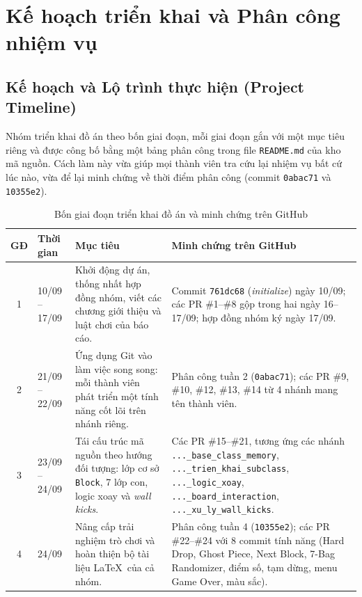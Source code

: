 \section{Kế hoạch triển khai và Phân công nhiệm vụ}

\subsection{Kế hoạch và Lộ trình thực hiện (Project Timeline)}

Nhóm triển khai đồ án theo bốn giai đoạn, mỗi giai đoạn gắn với một mục tiêu riêng và được công bố bằng một bảng phân công trong file \texttt{README.md} của kho mã nguồn. Cách làm này vừa giúp mọi thành viên tra cứu lại nhiệm vụ bất cứ lúc nào, vừa để lại minh chứng về thời điểm phân công (commit \texttt{0abac71} và \texttt{10355e2}).

\begin{table}[H]
    \centering
    \caption{Bốn giai đoạn triển khai đồ án và minh chứng trên GitHub}
    \label{tab:lo_trinh}
    \renewcommand{\arraystretch}{1.3}
    \begin{tabularx}{\textwidth}{|c|p{2.4cm}|p{5.8cm}|X|}
        \hline
        \textbf{GĐ} & \textbf{Thời gian} & \textbf{Mục tiêu} & \textbf{Minh chứng trên GitHub} \\
        \hline
        1 & 10/09 -- 17/09 & Khởi động dự án, thống nhất hợp đồng nhóm, viết các chương giới thiệu và luật chơi của báo cáo. & Commit \texttt{761dc68} (\textit{initialize}) ngày 10/09; các PR \#1--\#8 gộp trong hai ngày 16--17/09; hợp đồng nhóm ký ngày 17/09. \\
        \hline
        2 & 21/09 -- 22/09 & Ứng dụng Git vào làm việc song song: mỗi thành viên phát triển một tính năng cốt lõi trên nhánh riêng. & Phân công tuần 2 (\texttt{0abac71}); các PR \#9, \#10, \#12, \#13, \#14 từ 4 nhánh mang tên thành viên. \\
        \hline
        3 & 23/09 -- 24/09 & Tái cấu trúc mã nguồn theo hướng đối tượng: lớp cơ sở \texttt{Block}, 7 lớp con, logic xoay và \textit{wall kicks}. & Các PR \#15--\#21, tương ứng các nhánh \texttt{...\_base\_class\_memory}, \texttt{...\_trien\_khai\_subclass}, \texttt{...\_logic\_xoay}, \texttt{...\_board\_interaction}, \texttt{...\_xu\_ly\_wall\_kicks}. \\
        \hline
        4 & 24/09 & Nâng cấp trải nghiệm trò chơi và hoàn thiện bộ tài liệu \LaTeX\ của cả nhóm. & Phân công tuần 4 (\texttt{10355e2}); các PR \#22--\#24 với 8 commit tính năng (Hard Drop, Ghost Piece, Next Block, 7-Bag Randomizer, điểm số, tạm dừng, menu Game Over, màu sắc). \\
        \hline
    \end{tabularx}
\end{table}

